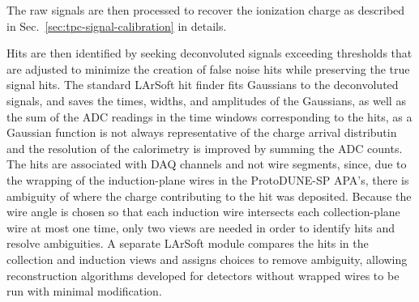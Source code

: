 The raw signals are then processed to recover the ionization charge
as described in Sec.~\ref{sec:tpc-signal-calibration} in details. 



Hits are then identified by seeking deconvoluted signals exceeding
thresholds that are adjusted to minimize the creation of false noise
hits while preserving the true signal hits.  The standard LArSoft hit
finder fits Gaussians to the deconvoluted signals, and saves the
times, widths, and amplitudes of the Gaussians, as well as the sum of
the ADC readings in the time windows corresponding to the hits, as a
Gaussian function is not always representative of the charge arrival
distributin and the resolution of the calorimetry is improved by
summing the ADC counts.  The hits are associated with DAQ channels and
not wire segments, since, due to the wrapping of the induction-plane
wires in the ProtoDUNE-SP APA's, there is ambiguity of where the
charge contributing to the hit was deposited.  Because the wire angle
is chosen so that each induction wire intersects each collection-plane
wire at most one time, only two views are needed in order to identify
hits and resolve ambiguities.  A separate LArSoft module compares the
hits in the collection and induction views and assigns choices to
remove ambiguity, allowing reconstruction algorithms developed for
detectors without wrapped wires to be run with minimal modification.

